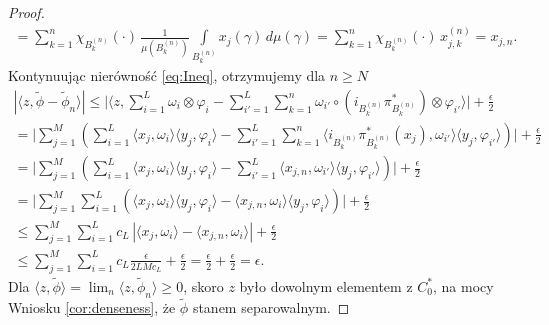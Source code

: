 \begin{proof}
\begin{eqnarray}
=\sum \limits_{k=1}^{n} \chi_{B_{k}^{(n)}}(\cdot) \,
\frac{1}{\mu(B_{k}^{(n)})}
\int \limits_{B_{k}^{(n)}} x_{j}(\gamma) \, d\mu(\gamma)
=\sum \limits_{k=1}^{n} \chi_{B_{k}^{(n)}}(\cdot) \,
x_{j,k}^{(n)}=x_{j,n}.
\end{eqnarray}
Kontynuując nierówność \eqref{eq:Ineq}, otrzymujemy dla $n \geq N$
\begin{eqnarray}
|\langle z, \tilde{\phi} - \tilde{\phi}_{n} \rangle|\leq \Big |\langle z,
\sum \limits_{i=1}^{L} \omega_{i} \otimes \varphi_{i} -\sum \limits_{i'=1}^{L}
\sum \limits_{k=1}^{n}\omega_{i'} \circ (i_{B_{k}^{(n)}} \pi^{*}_{B_{k}^{(n)}})
\otimes \varphi_{i'}\rangle \Big | + \frac{\epsilon}{2} \nonumber\\
= \Big |  \sum \limits_{j=1}^{M}\left( \sum \limits_{i =1}^{L}
\langle x_{j}, \omega_{i} \rangle \langle y_{j}, \varphi_{i} \rangle -
\sum \limits_{i'=1}^{L} \sum \limits_{k=1}^{n}     
\langle i_{B_{k}^{(n)}} \pi^{*}_{B_{k}^{(n)}} (x_{j}) ,
\omega_{i'} \rangle \langle y_{j}, \varphi_{i'} \rangle
\right) \Big |  + \frac{\epsilon}{2}\nonumber\\
= \Big | \sum \limits_{j=1}^{M}\left( \sum \limits_{i=1}^{L}
\langle x_{j}, \omega_{i} \rangle \langle y_{j}, \varphi_{i} \rangle  -
\sum \limits_{i'=1}^{L}\langle x_{j,n} , \omega_{i'} \rangle \langle y_{j}, \varphi_{i'} \rangle
\right) \Big |  + \frac{\epsilon}{2} \nonumber\\
= \Big | \sum \limits_{j=1}^{M} \sum \limits_{i=1}^{L}
\left(\langle x_{j}, \omega_{i} \rangle \langle y_{j}, \varphi_{i} \rangle  -
\langle x_{j,n} , \omega_{i} \rangle \langle y_{j}, \varphi_{i} \rangle
\right) \Big |  + \frac{\epsilon}{2} \nonumber\\
\leq \sum \limits_{j=1}^{M} \sum \limits_{i=1}^{L}
c_{L}  \, \left | \langle    x_{j}, \omega_{i} \rangle -
\langle x_{j,n} , \omega_{i} \rangle\right | + \frac{\epsilon}{2}\nonumber\\
\leq \sum \limits_{j=1}^{M} \sum \limits_{i=1}^{L}
c_{L}  \frac{\epsilon}{2 L M c_{L}}     + \frac{\epsilon}{2}
=  \frac{\epsilon}{2} +  \frac{\epsilon}{2} =  \epsilon.
\end{eqnarray}
Dla  $\langle z , \tilde{\phi} \rangle  =
\lim_{n} \langle z , \tilde{\phi}_{n} \rangle \geq 0$,
skoro $z$ było dowolnym elementem z $C_{0}^{*}$,
na mocy Wniosku \ref{cor:denseness},
że $\tilde{\phi}$ stanem separowalnym.
\end{proof}


